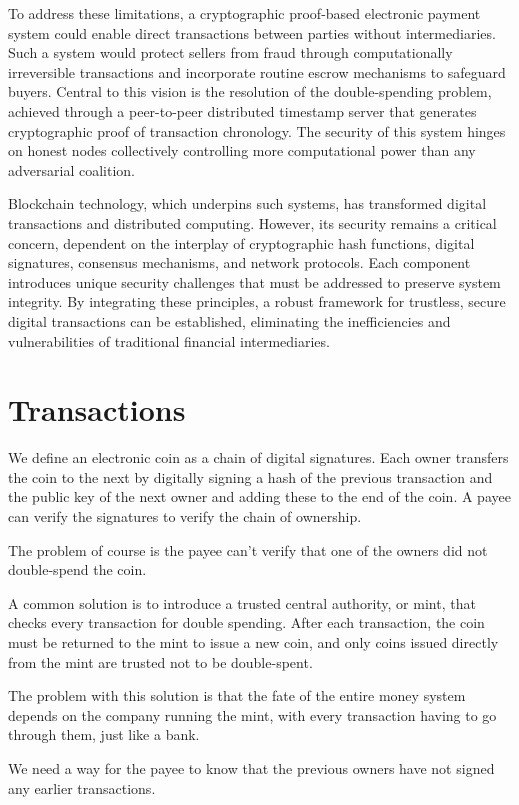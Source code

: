 \documentclass{article}
\begin{document}
To address these limitations, a cryptographic proof-based electronic payment system could enable direct transactions between parties without intermediaries. Such a system would protect sellers from fraud through computationally irreversible transactions and incorporate routine escrow mechanisms to safeguard buyers. Central to this vision is the resolution of the double-spending problem, achieved through a peer-to-peer distributed timestamp server that generates cryptographic proof of transaction chronology. The security of this system hinges on honest nodes collectively controlling more computational power than any adversarial coalition.

Blockchain technology, which underpins such systems, has transformed digital transactions and distributed computing. However, its security remains a critical concern, dependent on the interplay of cryptographic hash functions, digital signatures, consensus mechanisms, and network protocols. Each component introduces unique security challenges that must be addressed to preserve system integrity. By integrating these principles, a robust framework for trustless, secure digital transactions can be established, eliminating the inefficiencies and vulnerabilities of traditional financial intermediaries.

\section{Transactions}
We define an electronic coin as a chain of digital signatures. Each owner transfers the coin to the next by digitally signing a hash of the previous transaction and the public key of the next owner and adding these to the end of the coin. A payee can verify the signatures to verify the chain of ownership.

The problem of course is the payee can't verify that one of the owners did not double-spend the coin.

A common solution is to introduce a trusted central authority, or mint, that checks every transaction for double spending. After each transaction, the coin must be returned to the mint to issue a new coin, and only coins issued directly from the mint are trusted not to be double-spent.

The problem with this solution is that the fate of the entire money system depends on the company running the mint, with every transaction having to go through them, just like a bank.

We need a way for the payee to know that the previous owners have not signed any earlier transactions.
\end{document}
